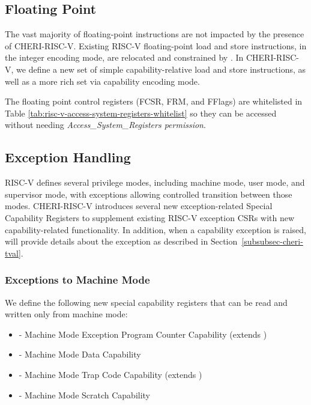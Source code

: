 \subsection{Floating Point}

The vast majority of floating-point instructions are not impacted by the
presence of CHERI-RISC-V.
Existing RISC-V floating-point load and store instructions, in the
integer encoding mode, are relocated and constrained by \DDC{}.
In CHERI-RISC-V, we define a new set of simple capability-relative load and
store instructions, as well as a more rich set via capability encoding mode.

The floating point control
registers (FCSR, FRM, and FFlags) are whitelisted in Table \ref{tab:risc-v-access-system-registers-whitelist}
so they can be accessed without needing \emph{Access\_System\_Registers permission}.

\subsection{Exception Handling}
\label{subsection:riscv:exceptionhandling}
RISC-V defines several privilege modes, including machine mode, user mode, and
supervisor mode, with exceptions allowing controlled transition between those modes.
CHERI-RISC-V introduces several new exception-related Special Capability Registers
to supplement existing RISC-V exception CSRs with new capability-related functionality.
In addition, when a capability exception is raised, \xtval{} will provide
details about the exception as described in Section~\ref{subsubsec-cheri-tval}.

\subsubsection{Exceptions to Machine Mode}
We define the following new special capability registers that can be read and
written only from machine mode:

\begin{itemize}
\item \MEPCC{} - Machine Mode Exception Program Counter Capability (extends
  \mepc{})
\item \MTDC{} - Machine Mode Data Capability
\item \MTCC{} - Machine Mode Trap Code Capability (extends \mtvec{})
\item \MScratchC{} - Machine Mode Scratch Capability
\end{itemize}

